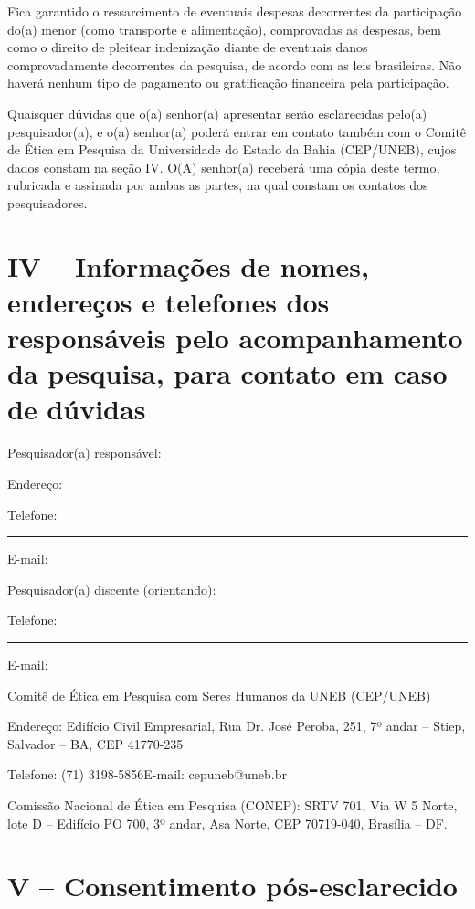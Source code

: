 Fica garantido o ressarcimento de eventuais despesas decorrentes da participação do(a) menor (como transporte e alimentação), comprovadas as despesas, bem como o direito de pleitear indenização diante de eventuais danos comprovadamente decorrentes da pesquisa, de acordo com as leis brasileiras. Não haverá nenhum tipo de pagamento ou gratificação financeira pela participação.

Quaisquer dúvidas que o(a) senhor(a) apresentar serão esclarecidas pelo(a) pesquisador(a), e o(a) senhor(a) poderá entrar em contato também com o Comitê de Ética em Pesquisa da Universidade do Estado da Bahia (CEP/UNEB), cujos dados constam na seção IV. O(A) senhor(a) receberá uma cópia deste termo, rubricada e assinada por ambas as partes, na qual constam os contatos dos pesquisadores.

\section{IV -- Informações de nomes, endereços e telefones dos responsáveis pelo acompanhamento da pesquisa, para contato em caso de dúvidas}

\noindent Pesquisador(a) responsável: \imprimirorientador

\noindent Endereço: \hrulefill

\noindent Telefone: \rule{4cm}{0.4pt}\hspace{0.8cm}E-mail: \hrulefill

\noindent Pesquisador(a) discente (orientando): \imprimirautor

\noindent Telefone: \rule{4cm}{0.4pt}\hspace{0.8cm}E-mail: \hrulefill

\noindent Comitê de Ética em Pesquisa com Seres Humanos da UNEB (CEP/UNEB)

\noindent Endereço: Edifício Civil Empresarial, Rua Dr. José Peroba, 251, 7º andar -- Stiep, Salvador -- BA, CEP 41770-235

\noindent Telefone: (71) 3198-5856\hspace{0.8cm}E-mail: cepuneb@uneb.br

\noindent Comissão Nacional de Ética em Pesquisa (CONEP): SRTV 701, Via W 5 Norte, lote D -- Edifício PO 700, 3º andar, Asa Norte, CEP 70719-040, Brasília -- DF.

\section{V -- Consentimento pós-esclarecido}

